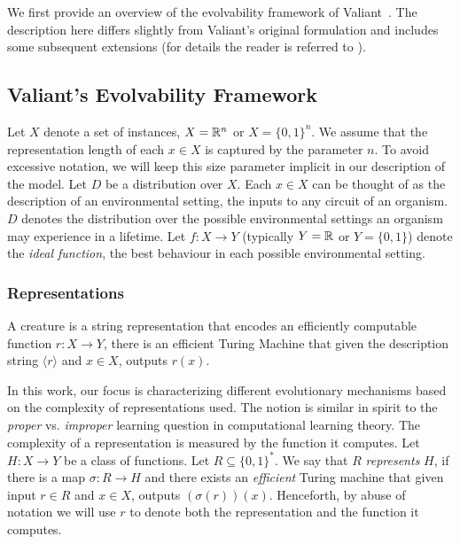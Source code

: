 We first provide an overview of the evolvability framework of
Valiant~\cite{Valiant:2009-evolvability}. The description here differs
slightly from Valiant's original formulation and includes some subsequent
extensions (for details the reader is referred to
\cite{Valiant:2009-evolvability,Feldman:2008-evolvability,
Feldman:2009-robustness, Valiant:2012-real, Kanade:2012-thesis}).

\subsection{Valiant's Evolvability Framework}

Let $X$ denote a set of instances, \eg $X = \mathbb{R}^n$ or $X = \{0, 1\}^n$. We
assume that the representation length of each $x \in X$ is captured by the
parameter $n$. To avoid excessive notation, we will keep this size parameter
implicit in our description of the model. Let $D$ be a distribution over $X$.
Each $x \in X$ can be thought of as the description of an environmental setting,
the inputs to any circuit of an organism. $D$ denotes the distribution over the
possible environmental settings an organism may experience in a lifetime. Let $f
: X \rightarrow Y$ (typically $Y = \mathbb{R}$ or $Y = \{0, 1\}$) denote the
\emph{ideal function}, the best behaviour in each possible environmental
setting.

\subsubsection*{Representations}

A creature is a string representation that encodes an efficiently computable
function $r : X \rightarrow Y$, \ie there is an efficient Turing Machine that
given the description string $\langle r \rangle$ and $x \in X$, outputs $r(x)$.  

In this work, our focus is characterizing different evolutionary mechanisms
based on the complexity of representations used. The notion is similar in spirit
to the \emph{proper} vs. \emph{improper} learning question in computational
learning theory. The complexity of a representation is measured by the function
it computes.  Let $H : X \rightarrow Y$ be a class of functions. Let $R
\subseteq \{0, 1\}^*$.  We say that $R$ \emph{represents} $H$, if there is a map
$\sigma : R \rightarrow H$ and there exists an \emph{efficient} Turing machine
that given input $r \in R$ and $x \in X$, outputs $(\sigma(r))(x)$. Henceforth,
by abuse of notation we will use $r$ to denote both the representation and the
function it computes.

